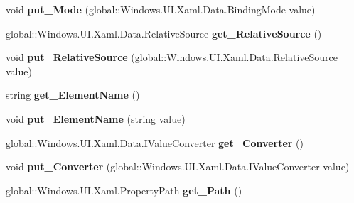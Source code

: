 \begin{DoxyCompactItemize}
void {\bfseries put\+\_\+\+Mode} (global\+::\+Windows.\+U\+I.\+Xaml.\+Data.\+Binding\+Mode value)
\item 
\mbox{\label{interface_windows_1_1_u_i_1_1_xaml_1_1_data_1_1_i_binding_ae412c463e60fc889a9838767ab62109a}} 
global\+::\+Windows.\+U\+I.\+Xaml.\+Data.\+Relative\+Source {\bfseries get\+\_\+\+Relative\+Source} ()
\item 
\mbox{\label{interface_windows_1_1_u_i_1_1_xaml_1_1_data_1_1_i_binding_ae29a2f22aa4de72a0e7619934ac6e60a}} 
void {\bfseries put\+\_\+\+Relative\+Source} (global\+::\+Windows.\+U\+I.\+Xaml.\+Data.\+Relative\+Source value)
\item 
\mbox{\label{interface_windows_1_1_u_i_1_1_xaml_1_1_data_1_1_i_binding_a0dd35d95c316a5990ee063205f2afa4f}} 
string {\bfseries get\+\_\+\+Element\+Name} ()
\item 
\mbox{\label{interface_windows_1_1_u_i_1_1_xaml_1_1_data_1_1_i_binding_a4a547237eb0c5a322ff147af7bffa296}} 
void {\bfseries put\+\_\+\+Element\+Name} (string value)
\item 
\mbox{\label{interface_windows_1_1_u_i_1_1_xaml_1_1_data_1_1_i_binding_aeb748478fa74d3af88e1a82f20a682c4}} 
global\+::\+Windows.\+U\+I.\+Xaml.\+Data.\+I\+Value\+Converter {\bfseries get\+\_\+\+Converter} ()
\item 
\mbox{\label{interface_windows_1_1_u_i_1_1_xaml_1_1_data_1_1_i_binding_a6f90eb586d1b47f03de725076ef98329}} 
void {\bfseries put\+\_\+\+Converter} (global\+::\+Windows.\+U\+I.\+Xaml.\+Data.\+I\+Value\+Converter value)
\item 
\mbox{\label{interface_windows_1_1_u_i_1_1_xaml_1_1_data_1_1_i_binding_a9ca632846713b560304c9843f74ed7a8}} 
global\+::\+Windows.\+U\+I.\+Xaml.\+Property\+Path {\bfseries get\+\_\+\+Path} ()
\item 
\mbox{\label{interface_windows_1_1_u_i_1_1_xaml_1_1_data_1_1_i_binding_a196462b99c9682d263adef2e1bbefa09}} 

\end{DoxyCompactItemize}
